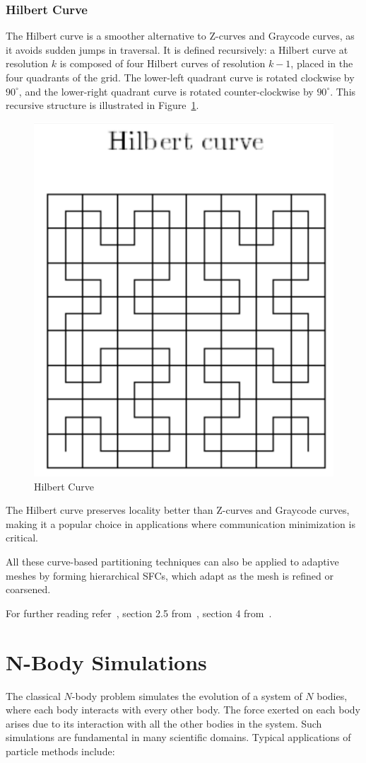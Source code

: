 \documentclass[12pt]{book}
\begin{document}
\subsubsection{Hilbert Curve}
The Hilbert curve is a smoother alternative to Z-curves and Graycode curves, as it avoids sudden jumps in traversal. It is defined recursively: a Hilbert curve at resolution $k$ is composed of four Hilbert curves of resolution $k-1$, placed in the four quadrants of the grid. The lower-left quadrant curve is rotated clockwise by $90^\circ$, and the lower-right quadrant curve is rotated counter-clockwise by $90^\circ$. This recursive structure is illustrated in Figure~\ref{fig:hilbertcurve}. 
\begin{figure}[ht]
    \centering
    \includegraphics[width=0.45\linewidth]{images/hilbertcurve.png}
    \caption{Hilbert Curve}
    \label{fig:hilbertcurve}
\end{figure}
The Hilbert curve preserves locality better than Z-curves and Graycode curves, making it a popular choice in applications where communication minimization is critical.

\medskip

All these curve-based partitioning techniques can also be applied to adaptive meshes by forming hierarchical SFCs, which adapt as the mesh is refined or coarsened.

For further reading refer~\cite{schloegel1997multilevel,schloegel1998dynamic}, section 2.5 from~\cite{campbell2003dynamic}, section 4 from~\cite{mokbel2001irregularity}.
\section{N-Body Simulations}
The classical $N$-body problem simulates the evolution of a system of $N$ bodies, where each body interacts with every other body. The force exerted on each body arises due to its interaction with all the other bodies in the system. Such simulations are fundamental in many scientific domains. Typical applications of particle methods include:
\end{document}
